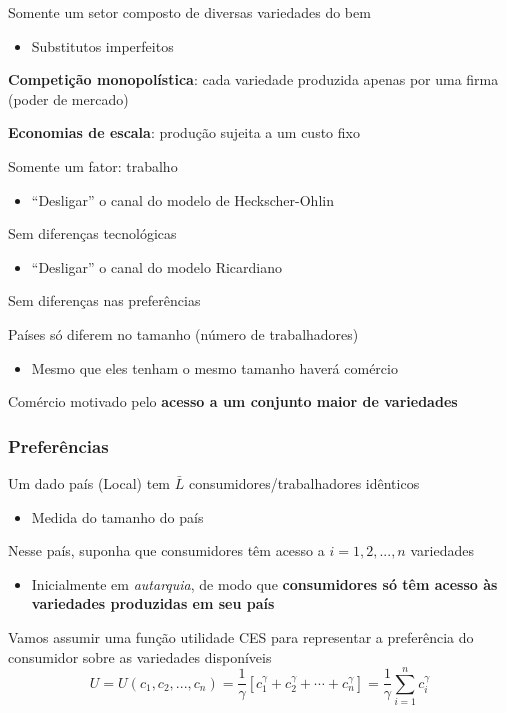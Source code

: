 \documentclass[a4paper,12pt]{article}[abntex2]
\begin{document}
Somente um setor composto de diversas variedades do bem\begin{itemize}
    \item Substitutos imperfeitos
\end{itemize}

\textbf{Competição monopolística}: cada variedade produzida apenas por uma firma (poder de mercado)

\textbf{Economias de escala}: produção sujeita a um custo fixo

Somente um fator: trabalho
\begin{itemize}
    \item “Desligar” o canal do modelo de Heckscher-Ohlin
\end{itemize}

Sem diferenças tecnológicas
\begin{itemize}
    \item “Desligar” o canal do modelo Ricardiano
\end{itemize}

Sem diferenças nas preferências

Países só diferem no tamanho (número de trabalhadores)
\begin{itemize}
    \item Mesmo que eles tenham o mesmo tamanho haverá comércio
\end{itemize}

Comércio motivado pelo \textbf{acesso a um conjunto maior de variedades}

\subsubsection{\textbf{Preferências}}

Um dado país (Local) tem \(\bar{L}\) consumidores/trabalhadores idênticos
\begin{itemize}
    \item Medida do tamanho do país
\end{itemize}

Nesse país, suponha que consumidores têm acesso a \(i = 1, 2, ..., n\) variedades
\begin{itemize}
    \item Inicialmente em \textit{autarquia}, de modo que \textbf{consumidores só têm acesso às variedades produzidas em seu país}
\end{itemize}

Vamos assumir uma função utilidade CES para representar a preferência do consumidor sobre as variedades disponíveis
\[
U = U(c_1, c_2, ..., c_n) = \frac{1}{\gamma} \left[c_1^{\gamma} + c_2^{\gamma} + \cdots + c_n^{\gamma}\right] = \frac{1}{\gamma} \sum_{i=1}^{n} c_i^{\gamma}
\]
\end{document}
